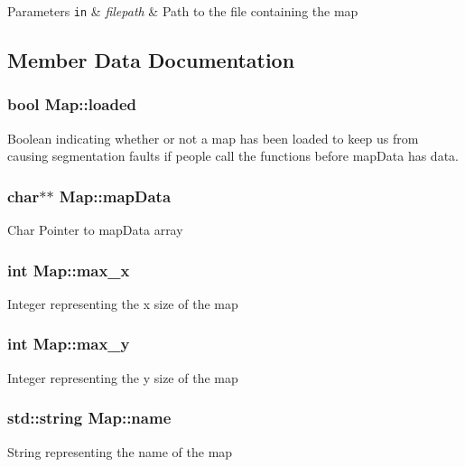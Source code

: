 \begin{DoxyParams}[1]{Parameters}
\mbox{\tt in}  & {\em filepath} & Path to the file containing the map \\
\hline
\end{DoxyParams}


\subsection{Member Data Documentation}
\hypertarget{class_map_ae7fbbd85e0cbd7219a468c56797a694f}{
\subsubsection[{loaded}]{\setlength{\rightskip}{0pt plus 5cm}bool Map\-::loaded\hspace{0.3cm}{\ttfamily [private]}}}\label{class_map_ae7fbbd85e0cbd7219a468c56797a694f}
Boolean indicating whether or not a map has been loaded to keep us from causing segmentation faults if people call the functions before map\-Data has data. \hypertarget{class_map_a167d123f263f5747306dc4dec00651e1}{
\subsubsection[{map\-Data}]{\setlength{\rightskip}{0pt plus 5cm}char$\ast$$\ast$ Map\-::map\-Data\hspace{0.3cm}{\ttfamily [private]}}}\label{class_map_a167d123f263f5747306dc4dec00651e1}
Char Pointer to map\-Data array \hypertarget{class_map_afd40399a6a6dc020966bdad376c27fd0}{
\subsubsection[{max\-\_\-x}]{\setlength{\rightskip}{0pt plus 5cm}int Map\-::max\-\_\-x\hspace{0.3cm}{\ttfamily [private]}}}\label{class_map_afd40399a6a6dc020966bdad376c27fd0}
Integer representing the x size of the map \hypertarget{class_map_a0b9d5fbb3b2080d4d44f7abc5cde78d0}{
\subsubsection[{max\-\_\-y}]{\setlength{\rightskip}{0pt plus 5cm}int Map\-::max\-\_\-y\hspace{0.3cm}{\ttfamily [private]}}}\label{class_map_a0b9d5fbb3b2080d4d44f7abc5cde78d0}
Integer representing the y size of the map \hypertarget{class_map_a1b1d492ae94e6ce4f76536bd33d8123c}{
\subsubsection[{name}]{\setlength{\rightskip}{0pt plus 5cm}std\-::string Map\-::name\hspace{0.3cm}{\ttfamily [private]}}}\label{class_map_a1b1d492ae94e6ce4f76536bd33d8123c}
String representing the name of the map 

